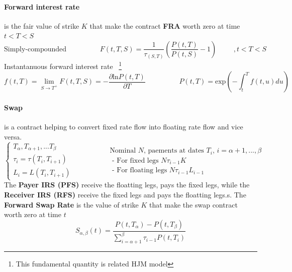 \documentclass[a4paper,10pt]{article}
\newcommand{\PtT}{P(t,T)}
\newcommand{\PtS}{P(t,S)}
\newcommand{\ftT}{f(t,T)}
\newcommand{\inttT}{\int_t^T}
\newcommand{\FuncExp}{\text{exp}}
\newcommand{\FuncLn}{\text{ln}}
\begin{document}
\paragraph{Forward interest rate} is the fair value of strike $K$ that make the contract \textbf{FRA} worth zero at time $t<T<S$  
\[
\text{Simply-compounded}
\hspace{2cm}
F(t,T,S) = \frac{1}{ \tau_{(S,T)} }\left( \frac{\PtT}{\PtS} - 1 \right)
\hspace{1cm}
,t<T<S
\]
Instantanuous forward interest rate ~\footnote{This fundamental quantity is related HJM model}
\[
\ftT = \lim_{S\rightarrow T^+} F(t,T,S) = -\frac{\partial \FuncLn\PtT}{\partial T}
\hspace{2cm}
\PtT = \FuncExp\left( -\inttT f(t,u)du \right)
\]

\paragraph{Swap} is a contract helping to convert fixed rate flow into floating rate flow and vice versa. 
\[
\left\{
\begin{array}{l}
T_{\alpha},T_{\alpha+1},...T_{\beta} \\
\tau_i = \tau(T_i,T_{i+1})           \\
L_i    = L(T_i,T_{i+1})
\end{array}
\right.
\hspace{2cm}
\begin{array}{l}
\text{Nominal $N$, paements at dates $T_i$,  } i=\alpha+1,...,\beta \\
\text{ - For fixed legs    } N\tau_{i-1}K  \\
\text{ - For floating legs } N\tau_{i-1}L_{i-1}  
\end{array}
\]
The \textbf{Payer IRS (PFS)} receive the floatting legs, pays the fixed legs, while the \textbf{Receiver IRS (RFS)} receive the fixed legs and pays the floatting legs.s. The \textbf{Forward Swap Rate} is the value of strike $K$ that make the swap contract worth zero at time $t$
\[
S_{\alpha,\beta}(t) = \frac{P(t,T_{\alpha})-P(t,T_{\beta})}{\sum^{\beta}_{i=\alpha+1}\tau_{i-1}P(t,T_i)} 
\]
\end{document}
